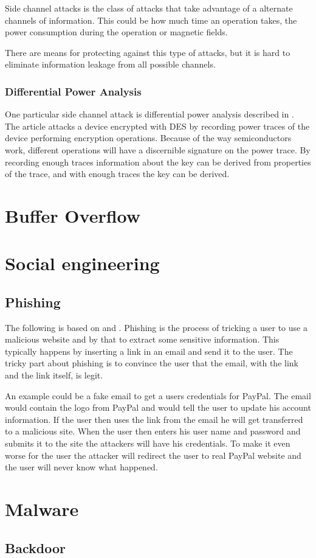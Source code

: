 Side channel attacks is the class of attacks that take advantage of a alternate channels of information.
This could be how much time an operation takes, the power consumption during the operation or magnetic fields.

There are means for protecting against this type of attacks, but it is hard to eliminate information leakage from all possible channels.

\subsubsection{Differential Power Analysis}
One particular side channel attack is differential power analysis described in \citet{DPA}.
The article attacks a device encrypted with DES by recording power traces of the device performing encryption operations.
Because of the way semiconductors work, different operations will have a discernible signature on the power trace.
By recording enough traces information about the key can be derived from properties of the trace, and with enough traces the key can be derived.


\section{Buffer Overflow}


\section{Social engineering}
\subsection{Phishing}

The following is based on \citet{security_engineering_ross_anderson} and \citet{dhamija2006phishing}.
Phishing is the process of tricking a user to use a malicious website and by that to extract some sensitive information.
This typically happens by inserting a link in an email and send it to the user.
The tricky part about phishing is to convince the user that the email, with the link and the link itself, is legit.

An example could be a fake email to get a users credentials for PayPal.
The email would contain the logo from PayPal and would tell the user to update his account information.
If the user then uses the link from the email he will get transferred to a malicious site.
When the user then enters his user name and password and submits it to the site the attackers will have his credentials.
To make it even worse for the user the attacker will redirect the user to real PayPal website and the user will never know what happened.

\section{Malware}
\subsection{Backdoor}
